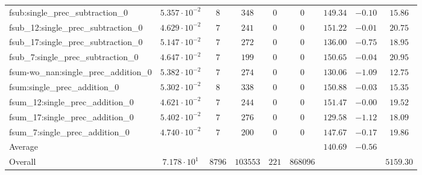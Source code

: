 \begin{tabular}{|l|c|c|c|c|c|c|c|c|}
fsub:single\_prec\_subtraction\_0              & $ 5.357 \cdot 10^{-2} $ & $ 8      $ & $ 348    $ & $ 0   $ & $ 0      $ & $ 149.34      $ & $ -0.10   $ & $ 15.86   $ \\
fsub\_12:single\_prec\_subtraction\_0          & $ 4.629 \cdot 10^{-2} $ & $ 7      $ & $ 241    $ & $ 0   $ & $ 0      $ & $ 151.22      $ & $ -0.01   $ & $ 20.75   $ \\
fsub\_17:single\_prec\_subtraction\_0          & $ 5.147 \cdot 10^{-2} $ & $ 7      $ & $ 272    $ & $ 0   $ & $ 0      $ & $ 136.00      $ & $ -0.75   $ & $ 18.95   $ \\
fsub\_7:single\_prec\_subtraction\_0           & $ 4.647 \cdot 10^{-2} $ & $ 7      $ & $ 199    $ & $ 0   $ & $ 0      $ & $ 150.65      $ & $ -0.04   $ & $ 20.95   $ \\
fsum-wo\_nan:single\_prec\_addition\_0         & $ 5.382 \cdot 10^{-2} $ & $ 7      $ & $ 274    $ & $ 0   $ & $ 0      $ & $ 130.06      $ & $ -1.09   $ & $ 12.75   $ \\
fsum:single\_prec\_addition\_0                 & $ 5.302 \cdot 10^{-2} $ & $ 8      $ & $ 338    $ & $ 0   $ & $ 0      $ & $ 150.88      $ & $ -0.03   $ & $ 15.35   $ \\
fsum\_12:single\_prec\_addition\_0             & $ 4.621 \cdot 10^{-2} $ & $ 7      $ & $ 244    $ & $ 0   $ & $ 0      $ & $ 151.47      $ & $ -0.00   $ & $ 19.52   $ \\
fsum\_17:single\_prec\_addition\_0             & $ 5.402 \cdot 10^{-2} $ & $ 7      $ & $ 276    $ & $ 0   $ & $ 0      $ & $ 129.58      $ & $ -1.12   $ & $ 18.09   $ \\
fsum\_7:single\_prec\_addition\_0              & $ 4.740 \cdot 10^{-2} $ & $ 7      $ & $ 200    $ & $ 0   $ & $ 0      $ & $ 147.67      $ & $ -0.17   $ & $ 19.86   $ \\
\hline
Average                                        & $                     $ & $        $ & $        $ & $     $ & $        $ & $ 140.69      $ & $ -0.56   $ & $         $ \\
\hline
Overall                                        & $ 7.178 \cdot 10^{1}  $ & $ 8796   $ & $ 103553 $ & $ 221 $ & $ 868096 $ & $             $ & $         $ & $ 5159.30 $ \\
\hline
\end{tabular}

